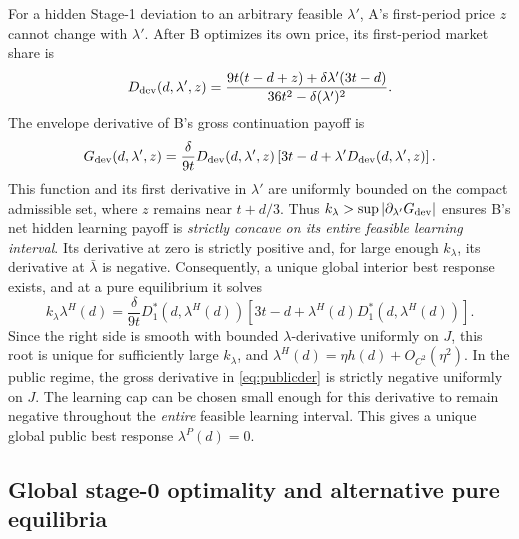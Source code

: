 \documentclass[11pt,a4paper]{article}
\numberwithin{equation}{section}
\theoremstyle{remark}
\newcommand{\kl}{k_{\lambda}}
\begin{document}
For a hidden Stage-1 deviation to an arbitrary feasible
$\lambda'$, A's first-period price $z$ cannot change with $\lambda'$.
After B optimizes its own price, its first-period market share is
\begin{equation}
 D_{\rm dev}(d,\lambda',z)=
 \frac{9t(t-d+z)+\delta\lambda'(3t-d)}
 {36t^2-\delta(\lambda')^2}.
 \label{eq:hidden_deviation_demand}
\end{equation}
The envelope derivative of B's gross continuation payoff is
\begin{equation}
 G_{\rm dev}(d,\lambda',z)=
 \frac{\delta}{9t}D_{\rm dev}(d,\lambda',z)
 \left[3t-d+\lambda'D_{\rm dev}(d,\lambda',z)\right].
 \label{eq:hidden_deviation_der}
\end{equation}
This function and its first derivative in $\lambda'$ are uniformly bounded
on the compact admissible set, where $z$ remains near $t+d/3$.
Thus $\kl>\sup|\partial_{\lambda'}G_{\rm dev}|$ ensures
B's net hidden learning payoff is \emph{strictly concave on its entire
feasible learning interval}. Its derivative at zero is strictly positive
and, for large enough $\kl$, its derivative at $\bar\lambda$ is
negative. Consequently, a unique global interior best response exists,
and at a pure equilibrium it solves
\begin{equation}
 \kl\lambda^H(d)=
 \frac{\delta}{9t}D_1^*(d,\lambda^H(d))
 \left[3t-d+\lambda^H(d)D_1^*(d,\lambda^H(d))\right].
 \label{eq:hidden_global_foc}
\end{equation}
Since the right side is smooth with bounded $\lambda$-derivative
uniformly on $J$, this root is unique for sufficiently large $\kl$,
and $\lambda^H(d)=\eta h(d)+O_{C^2}(\eta^2)$.
In the public regime, the gross derivative in
\eqref{eq:publicder} is strictly negative uniformly on $J$.
The learning cap can be chosen small enough for this derivative to
remain negative throughout the \emph{entire} feasible learning interval.
This gives a unique global public best response $\lambda^P(d)=0$.

\subsection*{Global stage-0 optimality and alternative pure equilibria}
\end{document}
